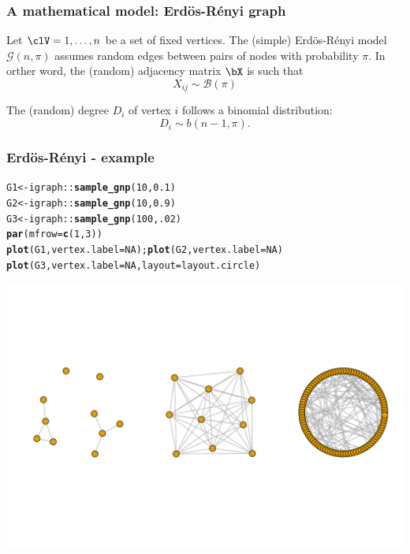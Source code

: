 \documentclass{beamer}\usepackage[]{graphicx}\usepackage[]{color}
\makeatletter
\newcommand{\hlnum}[1]{\textcolor[rgb]{0.686,0.059,0.569}{#1}}%
\newcommand{\hlopt}[1]{\textcolor[rgb]{0,0,0}{#1}}%
\newcommand{\hlstd}[1]{\textcolor[rgb]{0.345,0.345,0.345}{#1}}%
\newcommand{\hlkwb}[1]{\textcolor[rgb]{0.69,0.353,0.396}{#1}}%
\newcommand{\hlkwc}[1]{\textcolor[rgb]{0.333,0.667,0.333}{#1}}%
\newcommand{\hlkwd}[1]{\textcolor[rgb]{0.737,0.353,0.396}{\textbf{#1}}}%
\newenvironment{kframe}{%
 \def\at@end@of@kframe{}%
 \ifinner\ifhmode%
  \def\at@end@of@kframe{\end{minipage}}%
  \begin{minipage}{\columnwidth}%
 \fi\fi%
 \def\FrameCommand##1{\hskip\@totalleftmargin \hskip-\fboxsep
 \colorbox{shadecolor}{##1}\hskip-\fboxsep
     \hskip-\linewidth \hskip-\@totalleftmargin \hskip\columnwidth}%
 \MakeFramed {\advance\hsize-\width
   \@totalleftmargin\z@ \linewidth\hsize
   \@setminipage}}%
 {\par\unskip\endMakeFramed%
 \at@end@of@kframe}
\newenvironment{knitrout}{}{} %
\makeatother
\begin{document}
\begin{frame}
  \frametitle{A mathematical model: Erdös-Rényi graph}

  \begin{definition}
    Let $\clV = {1,\dots,n}$ be a set of fixed vertices. The (simple) Erdös-Rényi model $\mathcal{G}(n,\pi)$ assumes random edges between pairs of nodes with probability $\pi$. In orther word, the (random) adjacency matrix $\bX$ is such that
    \begin{equation*}
      X_{ij} \sim \mathcal{B}(\pi)
    \end{equation*}
  \end{definition}

  \vfill

  \begin{proposition}
    The (random) degree $D_i$ of vertex $i$ follows a binomial distribution:
      \begin{equation*}
        D_i \sim b(n-1, \pi).
      \end{equation*}
  \end{proposition}

\end{frame}

\begin{frame}[fragile]
  \frametitle{Erdös-Rényi - example}

\begin{knitrout}\scriptsize
{}\color{fgcolor}\begin{kframe}
\begin{alltt}
\hlstd{G1} \hlkwb{<-} \hlstd{igraph}\hlopt{::}\hlkwd{sample_gnp}\hlstd{(}\hlnum{10}\hlstd{,} \hlnum{0.1}\hlstd{)}
\hlstd{G2} \hlkwb{<-} \hlstd{igraph}\hlopt{::}\hlkwd{sample_gnp}\hlstd{(}\hlnum{10}\hlstd{,} \hlnum{0.9}\hlstd{)}
\hlstd{G3} \hlkwb{<-} \hlstd{igraph}\hlopt{::}\hlkwd{sample_gnp}\hlstd{(}\hlnum{100}\hlstd{,} \hlnum{.02}\hlstd{)}
\hlkwd{par}\hlstd{(}\hlkwc{mfrow}\hlstd{=}\hlkwd{c}\hlstd{(}\hlnum{1}\hlstd{,}\hlnum{3}\hlstd{))}
\hlkwd{plot}\hlstd{(G1,} \hlkwc{vertex.label}\hlstd{=}\hlnum{NA}\hlstd{) ;} \hlkwd{plot}\hlstd{(G2,} \hlkwc{vertex.label}\hlstd{=}\hlnum{NA}\hlstd{)}
\hlkwd{plot}\hlstd{(G3,} \hlkwc{vertex.label}\hlstd{=}\hlnum{NA}\hlstd{,} \hlkwc{layout}\hlstd{=layout.circle)}
\end{alltt}
\end{kframe}
\includegraphics[width=.8\textwidth]{figures/ER_example-1} 

\end{knitrout}
\end{frame}
\end{document}
